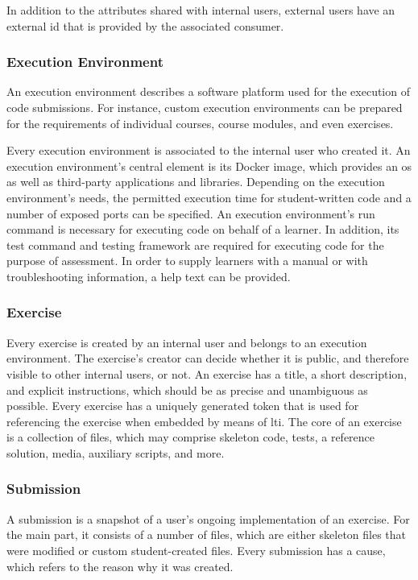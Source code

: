 In addition to the attributes shared with internal users, external users have an external \gls{id} that is provided by the associated consumer.

\subsubsection{Execution Environment}

An execution environment describes a software platform used for the execution of code submissions. For instance, custom execution environments can be prepared for the requirements of individual courses, course modules, and even exercises.

Every execution environment is associated to the internal user who created it. An execution environment's central element is its Docker image, which provides an \gls{os} as well as third-party applications and libraries. Depending on the execution environment's needs, the permitted execution time for student-written code and a number of exposed ports can be specified. An execution environment's run command is necessary for executing code on behalf of a learner. In addition, its test command and testing framework are required for executing code for the purpose of assessment. In order to supply learners with a manual or with troubleshooting information, a help text can be provided.

\subsubsection{Exercise}

Every exercise is created by an internal user and belongs to an execution environment. The exercise's creator can decide whether it is public, and therefore visible to other internal users, or not. An exercise has a title, a short description, and explicit instructions, which should be as precise and unambiguous as possible. Every exercise has a uniquely generated token that is used for referencing the exercise when embedded by means of \gls{lti}. The core of an exercise is a collection of files, which may comprise skeleton code, tests, a reference solution, media, auxiliary scripts, and more.

\subsubsection{Submission}

A submission is a snapshot of a user's ongoing implementation of an exercise. For the main part, it consists of a number of files, which are either skeleton files that were modified or custom student-created files. Every submission has a cause, which refers to the reason why it was created.

